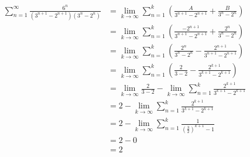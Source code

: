 \begin{align*}
\sum_{n = 1}^{\infty} \frac{6^n}{(3^{n+1} - 2^{n+1})(3^n - 2^n)}
&= \lim_{k \rightarrow \infty} \sum_{n = 1}^{k} \left( \frac{A}{3^{n+1} - 2^{n+1}} + \frac{B}{3^n - 2^n} \right) \\
&= \lim_{k \rightarrow \infty} \sum_{n = 1}^{k} \left( \frac{-2^{n+1}}{3^{n+1} - 2^{n+1}} + \frac{2^n}{3^n - 2^n} \right) \\
&= \lim_{k \rightarrow \infty} \sum_{n = 1}^{k} \left( \frac{2^n}{3^n - 2^n} - \frac{2^{n+1}}{3^{n+1} - 2^{n+1}} \right) \\
&= \lim_{k \rightarrow \infty} \sum_{n = 1}^{k} \left( \frac{2}{3 - 2} - \frac{2^{k+1}}{3^{k+1} - 2^{k+1}} \right) \\
&= \lim_{k \rightarrow \infty} \frac{2}{3-2} - \lim_{k \rightarrow \infty} \sum_{n = 1}^{k} \frac{2^{k+1}}{3^{k+1} - 2^{k+1}} \\
&= 2 - \lim_{k \rightarrow \infty} \sum_{n = 1}^{k} \frac{2^{k+1}}{3^{k+1} - 2^{k+1}} \\
&= 2 - \lim_{k \rightarrow \infty} \sum_{n = 1}^{k} \frac{1}{(\frac{3}{2})^{k+1} - 1} \\
&= 2 - 0 \\
&= \boxed{2}
\end{align*}
